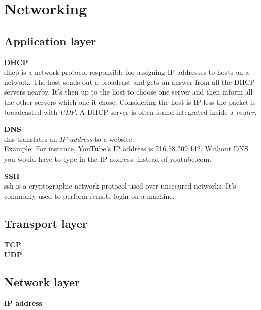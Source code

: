 \section{Networking}
    \begin{adjustwidth}{2.5em}{0cm}
    \parindent{.}   %


    \subsection{Application layer}
    \textbf{DHCP} \\
    \acrfull{dhcp} is a network protocol responsible for assigning IP addresses to hosts on a network. The host sends out a broadcast and gets an answer from all the DHCP-servers nearby. It's then up to the host to choose one server and then inform all the other servers which one it chose. Considering the host is IP-less the packet is broadcasted with \textit{UDP}. A DHCP server is often found integrated inside a \textit{router}. 

    
    \textbf{DNS}    \\
    \acrfull{dns} translates an \textit{IP-address} to a website. \\
    Example: For instance, YouTube's IP address is 216.58.209.142. Without DNS you would have to type in the IP-address, instead of youtube.com.  

    
    
    \textbf{SSH} \\
    \acrfull{ssh} is a cryptographic network protocol used over unsecured networks. It's commonly used to perform remote login on a machine. 
    \end{adjustwidth}
    
    \begin{adjustwidth}{2.5em}{}
    \subsection{Transport layer}
    \textbf{TCP} \\
    
    \textbf{UDP} \\
    \end{adjustwidth}
    
    \subsection{Network layer}
    \textbf{IP address} \\
    
